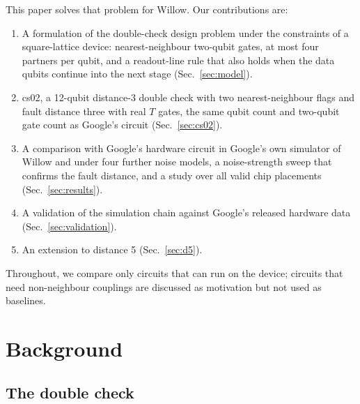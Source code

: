 \documentclass[aps,pra,reprint,superscriptaddress,longbibliography]{revtex4-2}
\newcommand{\csz}{\textsf{cs02}}
\begin{document}
This paper solves that problem for Willow.
Our contributions are:
\begin{enumerate}
\item A formulation of the double-check design problem under the constraints of a square-lattice device: nearest-neighbour two-qubit gates, at most four partners per qubit, and a readout-line rule that also holds when the data qubits continue into the next stage (Sec.~\ref{sec:model}).
\item \csz, a 12-qubit distance-3 double check with two nearest-neighbour flags and fault distance three with real $T$ gates, the same qubit count and two-qubit gate count as Google's circuit (Sec.~\ref{sec:cs02}).
\item A comparison with Google's hardware circuit in Google's own simulator of Willow and under four further noise models, a noise-strength sweep that confirms the fault distance, and a study over all valid chip placements (Sec.~\ref{sec:results}).
\item A validation of the simulation chain against Google's released hardware data (Sec.~\ref{sec:validation}).
\item An extension to distance 5 (Sec.~\ref{sec:d5}).
\end{enumerate}
Throughout, we compare only circuits that can run on the device; circuits that need non-neighbour couplings are discussed as motivation but not used as baselines.

\section{Background}
\label{sec:background}

\subsection{The double check}
\end{document}
